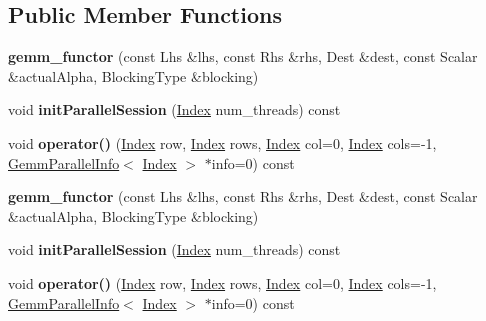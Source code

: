 \subsection*{Public Member Functions}
\begin{DoxyCompactItemize}
\item 
\mbox{\label{struct_eigen_1_1internal_1_1gemm__functor_ab6ef495befcff2df21dcd72b23c63d8b}} 
{\bfseries gemm\+\_\+functor} (const Lhs \&lhs, const Rhs \&rhs, Dest \&dest, const Scalar \&actual\+Alpha, Blocking\+Type \&blocking)
\item 
\mbox{\label{struct_eigen_1_1internal_1_1gemm__functor_a10901ca9388438219a91c0968e8118d9}} 
void {\bfseries init\+Parallel\+Session} (\hyperlink{namespace_eigen_a62e77e0933482dafde8fe197d9a2cfde}{Index} num\+\_\+threads) const
\item 
\mbox{\label{struct_eigen_1_1internal_1_1gemm__functor_adf335ccd5e878cddf3145d890c888ccb}} 
void {\bfseries operator()} (\hyperlink{namespace_eigen_a62e77e0933482dafde8fe197d9a2cfde}{Index} row, \hyperlink{namespace_eigen_a62e77e0933482dafde8fe197d9a2cfde}{Index} rows, \hyperlink{namespace_eigen_a62e77e0933482dafde8fe197d9a2cfde}{Index} col=0, \hyperlink{namespace_eigen_a62e77e0933482dafde8fe197d9a2cfde}{Index} cols=-\/1, \hyperlink{struct_eigen_1_1internal_1_1_gemm_parallel_info}{Gemm\+Parallel\+Info}$<$ \hyperlink{namespace_eigen_a62e77e0933482dafde8fe197d9a2cfde}{Index} $>$ $\ast$info=0) const
\item 
\mbox{\label{struct_eigen_1_1internal_1_1gemm__functor_ab6ef495befcff2df21dcd72b23c63d8b}} 
{\bfseries gemm\+\_\+functor} (const Lhs \&lhs, const Rhs \&rhs, Dest \&dest, const Scalar \&actual\+Alpha, Blocking\+Type \&blocking)
\item 
\mbox{\label{struct_eigen_1_1internal_1_1gemm__functor_a10901ca9388438219a91c0968e8118d9}} 
void {\bfseries init\+Parallel\+Session} (\hyperlink{namespace_eigen_a62e77e0933482dafde8fe197d9a2cfde}{Index} num\+\_\+threads) const
\item 
\mbox{\label{struct_eigen_1_1internal_1_1gemm__functor_adf335ccd5e878cddf3145d890c888ccb}} 
void {\bfseries operator()} (\hyperlink{namespace_eigen_a62e77e0933482dafde8fe197d9a2cfde}{Index} row, \hyperlink{namespace_eigen_a62e77e0933482dafde8fe197d9a2cfde}{Index} rows, \hyperlink{namespace_eigen_a62e77e0933482dafde8fe197d9a2cfde}{Index} col=0, \hyperlink{namespace_eigen_a62e77e0933482dafde8fe197d9a2cfde}{Index} cols=-\/1, \hyperlink{struct_eigen_1_1internal_1_1_gemm_parallel_info}{Gemm\+Parallel\+Info}$<$ \hyperlink{namespace_eigen_a62e77e0933482dafde8fe197d9a2cfde}{Index} $>$ $\ast$info=0) const
\end{DoxyCompactItemize}

